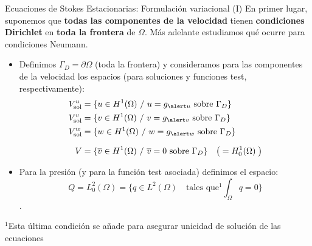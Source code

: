 \documentclass[9pt, dvipsnames,]{beamer}
\newcommand{\Vtest}{\ensuremath{V}}
\newcommand{\Vsol}{\ensuremath{V_{\text{sol}}}}
\newcommand{\VsolU}{\ensuremath{\Vsol^u}}
\newcommand{\VsolV}{\ensuremath{\Vsol^v}}
\newcommand{\VsolW}{\ensuremath{\Vsol^w}}
\begin{document}
\begin{frame}{Ecuaciones de Stokes Estacionarias: Formulación variacional (I)}
     En primer lugar, suponemos que \textbf{todas las componentes de la velocidad} tienen \textbf{condiciones \alert{Dirichlet}} en \textbf{toda la frontera} de $\Omega$. Más adelante estudiamos qué ocurre para condiciones Neumann.
     \bigskip

  \begin{itemize}\itemsep=0.6em
    \item Definimos $\Gamma_D = \partial\Omega$ (toda la frontera) y consideramos para las componentes de la velocidad los espacios (para soluciones y funciones test, respectivamente):
    \begin{align*}
      \VsolU &= \{ u\in H^1(\Omega) \ / \ u=g_{\alert u} 
            \text{ sobre } {\Gamma_D} \}
      \\
      \VsolV &= \{ v\in H^1(\Omega) \ / \ v=g_{\alert v}
            \text{ sobre } {\Gamma_D} \}
      \\
      \VsolW &= \{ w\in H^1(\Omega) \ / \ w=g_{\alert w}
            \text{ sobre } {\Gamma_D} \}
      \\[0.66em]
      \Vtest &= \{ \bv \in H^1(\Omega) \ /\ \bv=0 \text{ sobre }\Gamma_D \} \quad \big(= H^1_0(\Omega)\;\big)
    \end{align*}
  \item Para la presión (y para la función test asociada) definimos el espacio: 
    $$Q=L_0^2(\Omega) = \{q\in L^2(\Omega) \quad\text{tales que$^1$} \int_\Omega q = 0\}$$.
  \end{itemize}
\scriptsize\hfill{$^1$Esta última condición se añade para asegurar unicidad de solución de las ecuaciones}
\end{frame}
\end{document}
